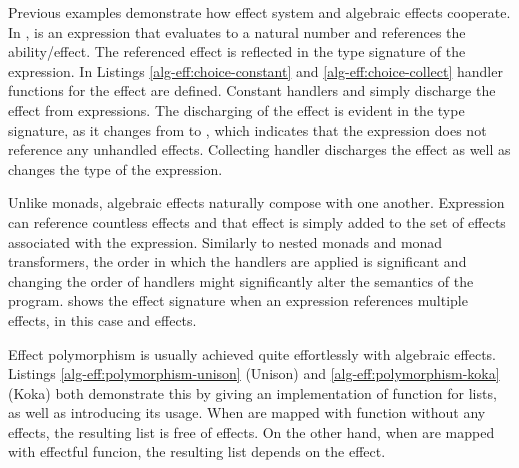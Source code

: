 Previous examples demonstrate how effect system and algebraic effects cooperate. In ,  is an expression that evaluates to a natural number and references the  ability/effect. The referenced effect is reflected in the type signature of the expression. In Listings \ref{alg-eff:choice-constant} and \ref{alg-eff:choice-collect} handler functions for the  effect are defined. Constant handlers  and  simply discharge the effect from expressions. The discharging of the effect is evident in the type signature, as it changes from  to , which indicates that the expression does not reference any unhandled effects. Collecting handler  discharges the effect as well as changes the type of the expression.

Unlike monads, algebraic effects naturally compose with one another. Expression can reference countless effects and that effect is simply added to the set of effects associated with the expression. Similarly to nested monads and monad transformers, the order in which the handlers are applied is significant and changing the order of handlers might significantly alter the semantics of the program.  shows the effect signature when an expression references multiple effects, in this case  and  effects.



Effect polymorphism is usually achieved quite effortlessly with algebraic effects. Listings \ref{alg-eff:polymorphism-unison} (Unison) and \ref{alg-eff:polymorphism-koka} (Koka) both demonstrate this by giving an implementation of  function for lists, as well as introducing its usage. When  are mapped with function without any effects, the resulting list  is free of effects. On the other hand, when  are mapped with effectful funcion, the resulting list  depends on the  effect. 





